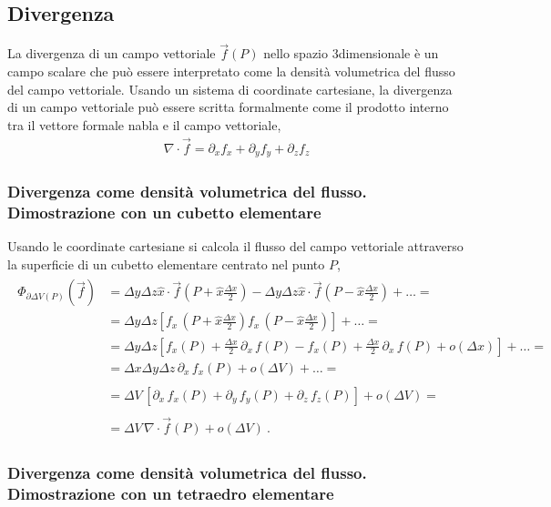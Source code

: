 \documentclass[letterpaper,10pt,english]{jupyterBook}
\begin{document}
\subsection{Divergenza}
\label{\detokenize{ch/vector-calculus/derivatives:divergenza}}
\sphinxAtStartPar
La divergenza di un campo vettoriale \(\vec{f}(P)\) nello spazio 3\sphinxhyphen{}dimensionale è un campo scalare che può essere interpretato come la densità volumetrica del flusso del campo vettoriale. Usando un sistema di coordinate cartesiane, la divergenza di un campo vettoriale può essere scritta formalmente come il prodotto interno tra il vettore formale nabla e il campo vettoriale,
\begin{equation*}
\begin{split}\nabla \cdot \vec{f} = \partial_x f_x + \partial_y f_y + \partial_z f_z\end{split}
\end{equation*}\subsubsection*{Divergenza come densità volumetrica del flusso. Dimostrazione con un cubetto elementare}

\sphinxAtStartPar
Usando le coordinate cartesiane si calcola il flusso del campo vettoriale attraverso la superficie di un cubetto elementare centrato nel punto \(P\), 
\begin{equation*}
\begin{split}\begin{aligned}
  \Phi_{\partial \Delta V(P)}\left(\vec{f}\right) 
  & = \Delta y \Delta z \hat{x} \cdot \vec{f}\left(P+\hat{x} \frac{\Delta x}{2} \right)
    - \Delta y \Delta z \hat{x} \cdot \vec{f}\left(P-\hat{x} \frac{\Delta x}{2} \right) + \dots = \\
  & = \Delta y \Delta z \left[ f_x \, \left(P+\hat{x} \frac{\Delta x}{2} \right)
                               f_x \, \left(P-\hat{x} \frac{\Delta x}{2} \right) \right] + \dots = \\
  & = \Delta y \Delta z \left[ f_x(P) + \frac{\Delta x}{2} \,  \partial_x \, f(P) 
                             - f_x(P) + \frac{\Delta x}{2} \,  \partial_x \, f(P) + o(\Delta x) \right] + \dots  = \\
  & = \Delta x \Delta y \Delta z \,  \partial_x \, f_x(P) + o(\Delta V) + \dots = \\ \\
  & = \Delta V \, \left[  \partial_x \, f_x(P) +  \partial_y \, f_y(P) + \partial_z \, f_z(P) \right] + o(\Delta V) = \\ \\
  & = \Delta V \, \nabla \cdot \vec{f}(P) + o(\Delta V) \ .
\end{aligned}\end{split}
\end{equation*}\subsubsection*{Divergenza come densità volumetrica del flusso. Dimostrazione con un tetraedro elementare}
\end{document}
